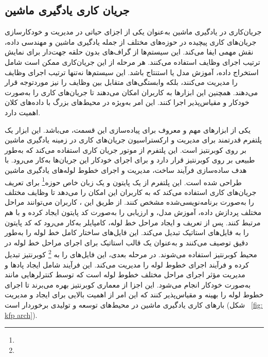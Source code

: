 \subsection{جریان کاری یادگیری ماشین}
جریان‌کاری در یادگیری ماشین به‌عنوان یکی از اجزای حیاتی در مدیریت و خودکارسازی جریان‌های کاری پیچیده در حوزه‌های مختلف از جمله یادگیری ماشین و مهندسی داده، نقش مهمی ایفا می‌کند. این سیستم‌ها از گراف‌های بدون حلقه جهت‌دار برای نمایش ترتیب اجرای وظایف استفاده می‌کنند. هر مرحله از این جریان‌کاری ممکن است شامل استخراج داده، آموزش مدل یا استنتاج باشد. این سیستم‌ها نه‌تنها ترتیب اجرای وظایف را مدیریت می‌کنند، بلکه وابستگی‌های متقابل بین وظایف را نیز موردتوجه قرار می‌دهند. همچنین این ابزارها به کاربران امکان می‌دهند تا جریان‌های کاری را به‌صورت خودکار و مقیاس‌پذیر اجرا کنند. این امر به‌ویژه در محیط‌های بزرگ با داده‌های کلان اهمیت دارد.

یکی از ابزارهای مهم و معروف برای پیاده‌سازی این قسمت،  می‌باشد. این ابزار یک پلتفرم قدرتمند برای مدیریت و ارکستراسیون جریان‌های کاری در زمینه یادگیری ماشین بر روی کوبرنتیز است. این پلتفرم از موتور جریان کاری  استفاده می‌کند که به‌طور طبیعی بر روی کوبرنتیز قرار دارد و برای اجرای خودکار این جریان‌ها به‌کار می‌رود.  با هدف ساده‌سازی فرآیند ساخت، مدیریت و اجرای خطوط لوله‌های یادگیری ماشین طراحی شده است. این پلتفرم از یک  پایتون و یک زبان خاص حوزه\footnote{} برای تعریف جریان‌های کاری استفاده می‌کند که به کاربران این امکان را می‌دهد تا وظایف مختلف را به‌صورت برنامه‌نویسی‌شده مشخص کنند. از طریق این ، کاربران می‌توانند مراحل مختلف پردازش داده، آموزش مدل، و ارزیابی را به‌صورت کد پایتون ایجاد کرده و با هم مرتبط کنند. پس از تعریف و ایجاد مراحل خط لوله، کامپایلر  به‌کار می‌رود که کد پایتون را به فایل‌های  استاتیک تبدیل می‌کند. این فایل‌های  ساختار کامل خط لوله را به‌طور دقیق توصیف می‌کنند و به‌عنوان یک قالب استاتیک برای اجرای مراحل خط لوله در محیط کوبرنتیز استفاده می‌شوند.  در مرحله بعدی، این فایل‌های  را به \footnote{} کوبرنتیز تبدیل کرده و فرآیند اجرای خطوط لوله را مدیریت می‌کند. این فرآیند شامل ایجاد پادها و مدیریت مؤثر اجرای مراحل مختلف خطوط لوله است که توسط کنترلرهایی مانند  به‌صورت خودکار انجام می‌شود. این اجزا از معماری کوبرنتیز بهره می‌برند تا اجرای خطوط لوله را بهینه و مقیاس‌پذیر کنند که این امر از اهمیت بالایی برای ایجاد و مدیریت بارهای کاری یادگیری ماشین در محیط‌های توسعه و تولیدی برخوردار است (شکل ~\ref{fig: kfp arch}).

